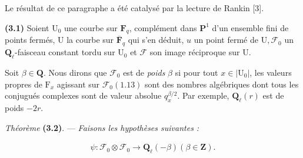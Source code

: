 \documentclass[10pt,leqno]{article}
\begin{document}
\noindent Le résultat de ce paragraphe a été catalysé par la lecture de Rankin [3].\par

\noindent \textbf{(3.1)} Soient \(\mathrm{U}_{0}\) une courbe sur \(\mathbf{F}_{q}\), complément dans \(\mathbf{P}^{1}\) d’un ensemble fini de points fermés, \(\mathrm{U}\) la courbe sur \(\overline{\mathbf{F}}_{q}\) qui s’en déduit, \(u\) un point fermé de \(\mathrm{U}, \mathcal{F} _{0}\) un \(\mathbf{Q}_{\ell }\)-faisceau constant tordu sur \(\mathrm{U}_{0}\) et \(\mathcal{F} \) son image réciproque sur \(\mathrm{U}\).\par

\clearpage

\label{physical-13}\par\smallskip

\noindent Soit \(\beta \in \mathbf{Q}\). Nous dirons que \(\mathcal{F} _{0}\) est de \emph{poids} \(\beta \) si pour tout \(x\in |\mathrm{U}_{0}|\), les valeurs propres de \(\mathrm{F}_{x}\) agissant sur \(\mathcal{F} _{0} (1.13)\) sont des nombres algébriques dont tous les conjugués complexes sont de valeur absolue \(q_{x}^{\beta /2}\). Par exemple, \(\mathbf{Q}_{\ell }(r)\) est de poids \(- 2r\).\par

\noindent \emph{Théorème} \textbf{(3.2)}. — {\itshape Faisons les hypothèses suivantes :}\par

\par

\begin{equation*}\begin{gathered}\psi  : \mathcal{F} _{0}\otimes \mathcal{F} _{0} \longrightarrow  \mathbf{Q}_{\ell }(- \beta )    (\beta \in \mathbf{Z}).\end{gathered}\end{equation*}

\par

\par
\end{document}
